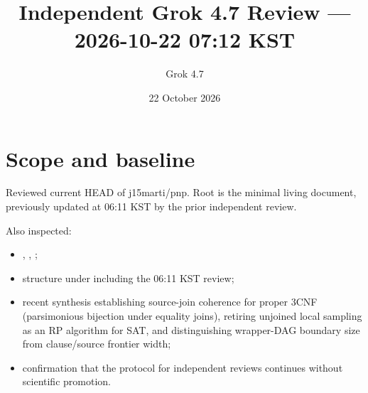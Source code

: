 \documentclass[11pt]{article}
\title{Independent Grok 4.7 Review --- 2026-10-22 07:12 KST}
\author{Grok 4.7}
\date{22 October 2026}
\begin{document}
\maketitle

\begin{center}
\end{center}

\section{Scope and baseline}
Reviewed current HEAD of j15marti/pnp. Root  is the minimal living document, previously updated at 06:11 KST by the prior independent review.

Also inspected:
\begin{itemize}
\item {}, , ;
\item structure under  including the 06:11 KST review;
\item recent synthesis  establishing source-join coherence for proper 3CNF (parsimonious bijection under equality joins), retiring unjoined local sampling as an RP algorithm for SAT, and distinguishing wrapper-DAG boundary size from clause/source frontier width;
\item confirmation that the protocol for independent reviews continues without scientific promotion.
\end{itemize}
\end{document}
